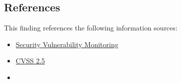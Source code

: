 \subsection*{References}

This finding references the following information sources:

\begin{itemize}
    \item \href{https://svm.cert.siemens.com/portal/}{Security Vulnerability Monitoring}
	\item \href{https://www.first.org/cvss/calculator/3.1#CVSS:3.1/AV:L/AC:H/PR:L/UI:N/S:U/C:L/I:N/A:N}{CVSS 2.5}
	\item {}
\end{itemize}




